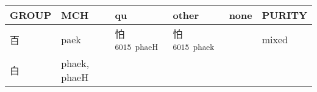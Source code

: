 \documentclass[14pt,a4paper]{scrartcl}
\begin{document}
\begin{longtable}[c]{@{}llllll@{}}
\toprule
\begin{minipage}[b]{0.14\columnwidth}\raggedright\strut
GROUP
\strut\end{minipage} &
\begin{minipage}[b]{0.14\columnwidth}\raggedright\strut
MCH
\strut\end{minipage} &
\begin{minipage}[b]{0.14\columnwidth}\raggedright\strut
qu
\strut\end{minipage} &
\begin{minipage}[b]{0.14\columnwidth}\raggedright\strut
other
\strut\end{minipage} &
\begin{minipage}[b]{0.14\columnwidth}\raggedright\strut
none
\strut\end{minipage} &
\begin{minipage}[b]{0.14\columnwidth}\raggedright\strut
PURITY
\strut\end{minipage}\tabularnewline
\midrule
\endhead
\begin{minipage}[t]{0.14\columnwidth}\raggedright\strut
百
\strut\end{minipage} &
\begin{minipage}[t]{0.14\columnwidth}\raggedright\strut
paek
\strut\end{minipage} &
\begin{minipage}[t]{0.14\columnwidth}\raggedright\strut
怕\textsuperscript{6015~phaeH}
\strut\end{minipage} &
\begin{minipage}[t]{0.14\columnwidth}\raggedright\strut
怕\textsuperscript{6015~phaek}
\strut\end{minipage} &
\begin{minipage}[t]{0.14\columnwidth}\raggedright\strut
\strut\end{minipage} &
\begin{minipage}[t]{0.14\columnwidth}\raggedright\strut
mixed
\strut\end{minipage}\tabularnewline
\begin{minipage}[t]{0.14\columnwidth}\raggedright\strut
白
\strut\end{minipage} &
\begin{minipage}[t]{0.14\columnwidth}\raggedright\strut
phaek, phaeH
\strut\end{minipage} &
\begin{minipage}[t]{0.14\columnwidth}\raggedright\strut
\strut\end{minipage} &

\end{longtable}
\end{document}
